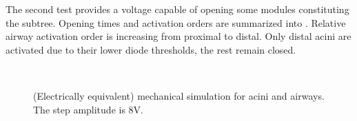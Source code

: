 
\clearpage
The second test provides a voltage capable of opening some modules
constituting the subtree.  Opening times and activation orders are
summarized into .  Relative
airway activation order is increasing from proximal to distal.  Only
distal acini are activated due to their lower diode thresholds, the
rest remain closed.
\vspace{1.05em}

\begin{figure}[H]\centering
  \hspace{1cm}
  \\
  \hspace{1cm}
  \caption{(Electrically equivalent) mechanical simulation for acini
    and airways.  The step amplitude is 8V.}
  \label{fig:mechanical_results_8_2}
\end{figure}

